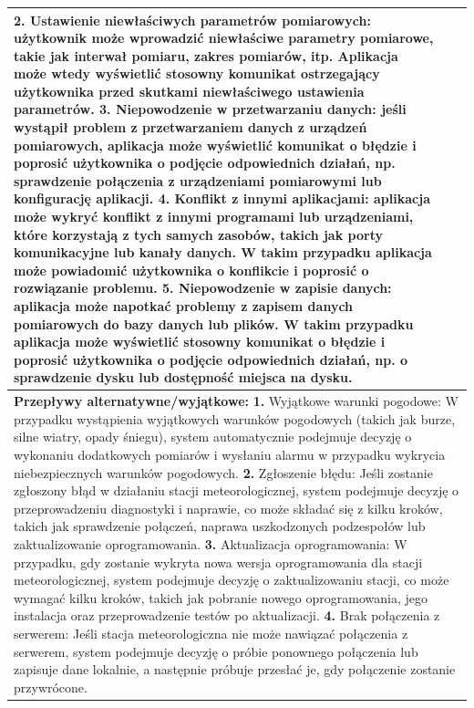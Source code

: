 \documentclass{article}
\begin{document}
\begin{center}
\begin{center}
\begin{tabular}{|l|l|l|}
{        \textbf{2.} Ustawienie niewłaściwych parametrów pomiarowych: użytkownik może wprowadzić niewłaściwe parametry pomiarowe, takie jak interwał pomiaru, zakres pomiarów, itp. Aplikacja może wtedy wyświetlić stosowny komunikat ostrzegający użytkownika przed skutkami niewłaściwego ustawienia parametrów.
        \newline
        \textbf{3.} Niepowodzenie w przetwarzaniu danych: jeśli wystąpił problem z przetwarzaniem danych z urządzeń pomiarowych, aplikacja może wyświetlić komunikat o błędzie i poprosić użytkownika o podjęcie odpowiednich działań, np. sprawdzenie połączenia z urządzeniami pomiarowymi lub konfigurację aplikacji.
        \newline
        \textbf{4.} Konflikt z innymi aplikacjami: aplikacja może wykryć konflikt z innymi programami lub urządzeniami, które korzystają z tych samych zasobów, takich jak porty komunikacyjne lub kanały danych. W takim przypadku aplikacja może powiadomić użytkownika o konflikcie i poprosić o rozwiązanie problemu.
        \newline
        \textbf{5.} Niepowodzenie w zapisie danych: aplikacja może napotkać problemy z zapisem danych pomiarowych do bazy danych lub plików. W takim przypadku aplikacja może wyświetlić stosowny komunikat o błędzie i poprosić użytkownika o podjęcie odpowiednich działań, np. o sprawdzenie dysku lub dostępność miejsca na dysku.} \\
        \hline
        \hline
        \multicolumn{3}{|p{\dimexpr\linewidth-2\tabcolsep-2\arrayrulewidth}|}{\textbf{Przepływy alternatywne/wyjątkowe:}
        \newline
        \textbf{1.} Wyjątkowe warunki pogodowe: W przypadku wystąpienia wyjątkowych warunków pogodowych (takich jak burze, silne wiatry, opady śniegu), system automatycznie podejmuje decyzję o wykonaniu dodatkowych pomiarów i wysłaniu alarmu w przypadku wykrycia niebezpiecznych warunków pogodowych.
        \newline
        \textbf{2.} Zgłoszenie błędu: Jeśli zostanie zgłoszony błąd w działaniu stacji meteorologicznej, system podejmuje decyzję o przeprowadzeniu diagnostyki i naprawie, co może składać się z kilku kroków, takich jak sprawdzenie połączeń, naprawa uszkodzonych podzespołów lub zaktualizowanie oprogramowania.
        \newline
        \textbf{3.} Aktualizacja oprogramowania: W przypadku, gdy zostanie wykryta nowa wersja oprogramowania dla stacji meteorologicznej, system podejmuje decyzję o zaktualizowaniu stacji, co może wymagać kilku kroków, takich jak pobranie nowego oprogramowania, jego instalacja oraz przeprowadzenie testów po aktualizacji.
        \newline
        \textbf{4.} Brak połączenia z serwerem: Jeśli stacja meteorologiczna nie może nawiązać połączenia z serwerem, system podejmuje decyzję o próbie ponownego połączenia lub zapisuje dane lokalnie, a następnie próbuje przesłać je, gdy połączenie zostanie przywrócone.} \\
        \hline
        \end{tabular}
    \end{center}


\end{center}
\end{document}
